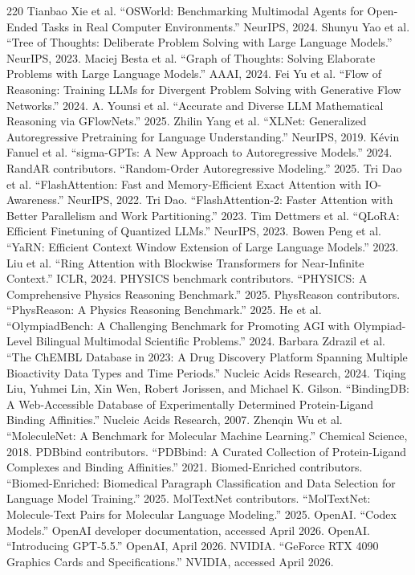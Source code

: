 \documentclass[11pt]{article}
\newcommand{\1}{\mathbf{1}}
\begin{document}
\begin{thebibliography}{220}
 Tianbao Xie et al. ``OSWorld: Benchmarking Multimodal Agents for Open-Ended Tasks in Real Computer Environments.'' NeurIPS, 2024.
 Shunyu Yao et al. ``Tree of Thoughts: Deliberate Problem Solving with Large Language Models.'' NeurIPS, 2023.
 Maciej Besta et al. ``Graph of Thoughts: Solving Elaborate Problems with Large Language Models.'' AAAI, 2024.
 Fei Yu et al. ``Flow of Reasoning: Training LLMs for Divergent Problem Solving with Generative Flow Networks.'' 2024.
 A. Younsi et al. ``Accurate and Diverse LLM Mathematical Reasoning via GFlowNets.'' 2025.
 Zhilin Yang et al. ``XLNet: Generalized Autoregressive Pretraining for Language Understanding.'' NeurIPS, 2019.
 Kévin Fanuel et al. ``sigma-GPTs: A New Approach to Autoregressive Models.'' 2024.
 RandAR contributors. ``Random-Order Autoregressive Modeling.'' 2025.
 Tri Dao et al. ``FlashAttention: Fast and Memory-Efficient Exact Attention with IO-Awareness.'' NeurIPS, 2022.
 Tri Dao. ``FlashAttention-2: Faster Attention with Better Parallelism and Work Partitioning.'' 2023.
 Tim Dettmers et al. ``QLoRA: Efficient Finetuning of Quantized LLMs.'' NeurIPS, 2023.
 Bowen Peng et al. ``YaRN: Efficient Context Window Extension of Large Language Models.'' 2023.
 Liu et al. ``Ring Attention with Blockwise Transformers for Near-Infinite Context.'' ICLR, 2024.
 PHYSICS benchmark contributors. ``PHYSICS: A Comprehensive Physics Reasoning Benchmark.'' 2025.
 PhysReason contributors. ``PhysReason: A Physics Reasoning Benchmark.'' 2025.
 He et al. ``OlympiadBench: A Challenging Benchmark for Promoting AGI with Olympiad-Level Bilingual Multimodal Scientific Problems.'' 2024.
 Barbara Zdrazil et al. ``The ChEMBL Database in 2023: A Drug Discovery Platform Spanning Multiple Bioactivity Data Types and Time Periods.'' Nucleic Acids Research, 2024.
 Tiqing Liu, Yuhmei Lin, Xin Wen, Robert Jorissen, and Michael K. Gilson. ``BindingDB: A Web-Accessible Database of Experimentally Determined Protein-Ligand Binding Affinities.'' Nucleic Acids Research, 2007.
 Zhenqin Wu et al. ``MoleculeNet: A Benchmark for Molecular Machine Learning.'' Chemical Science, 2018.
 PDBbind contributors. ``PDBbind: A Curated Collection of Protein-Ligand Complexes and Binding Affinities.'' 2021.
 Biomed-Enriched contributors. ``Biomed-Enriched: Biomedical Paragraph Classification and Data Selection for Language Model Training.'' 2025.
 MolTextNet contributors. ``MolTextNet: Molecule-Text Pairs for Molecular Language Modeling.'' 2025.
 OpenAI. ``Codex Models.'' OpenAI developer documentation, accessed April 2026.
 OpenAI. ``Introducing GPT-5.5.'' OpenAI, April 2026.
 NVIDIA. ``GeForce RTX 4090 Graphics Cards and Specifications.'' NVIDIA, accessed April 2026.


\end{thebibliography}
\end{document}
